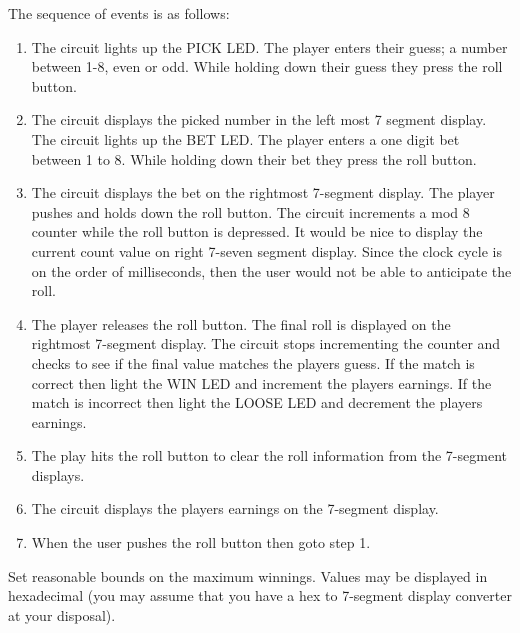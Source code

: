 \begin{description}
        The sequence of events is as follows:
        \begin{enumerate}
            \item    The circuit lights up the PICK LED.
                The player enters their guess; a number between 1-8, even or odd.
                While holding down their guess they press the roll button.
            \item    The circuit displays the picked number in the left most
                7 segment display.  The circuit lights up the BET LED.
                The player enters a one digit bet between 1 to 8.  While holding
                down their bet they press the roll button.
            \item     The circuit displays the bet on the rightmost 7-segment
                display.
                The player pushes and holds down the roll button.
                The circuit increments a mod 8 counter while the roll
                button is depressed. It would be nice to display the
                current count value on right 7-seven segment display.
                Since the clock cycle is on the order of milliseconds,
                then the user would not be able to anticipate the roll.
            \item    The player releases the roll button.  The final roll
                is displayed on the rightmost 7-segment display.
                The circuit stops incrementing the counter and checks
                to see if the final value matches the players guess.
                If the match is correct then light the WIN LED and
                increment the players earnings.  If the match is incorrect
                then light the LOOSE LED and decrement the players
                earnings.
            \item    The play hits the roll button to clear the roll information
                from the 7-segment displays.
            \item    The circuit displays the players earnings on the 7-segment
                display.
            \item    When the user pushes the roll button then goto step 1.
        \end{enumerate}

        Set reasonable bounds on the maximum winnings.  Values may be displayed
        in hexadecimal (you may assume that you have a hex to 7-segment display
        converter at your disposal).
        \\
        \\


\end{description}
